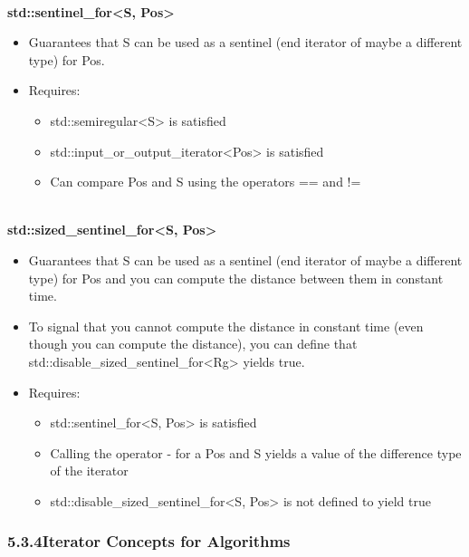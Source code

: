 \noindent
\hspace*{\fill} \\ %
\textbf{std::sentinel\_for<S, Pos>}

\begin{itemize}
\item
Guarantees that S can be used as a sentinel (end iterator of maybe a different type) for Pos.

\item
Requires:
\begin{itemize}
\item
std::semiregular<S> is satisfied

\item
std::input\_or\_output\_iterator<Pos> is satisfied

\item
Can compare Pos and S using the operators == and !=
\end{itemize}
\end{itemize}

\noindent
\hspace*{\fill} \\ %
\textbf{std::sized\_sentinel\_for<S, Pos>}

\begin{itemize}
\item
Guarantees that S can be used as a sentinel (end iterator of maybe a different type) for Pos and you can compute the distance between them in constant time.

\item
To signal that you cannot compute the distance in constant time (even though you can compute the distance), you can define that std::disable\_sized\_sentinel\_for<Rg> yields true.

\item
Requires:
\begin{itemize}
\item
std::sentinel\_for<S, Pos> is satisfied

\item
Calling the operator - for a Pos and S yields a value of the difference type of the iterator

\item
std::disable\_sized\_sentinel\_for<S, Pos> is not defined to yield true
\end{itemize}
\end{itemize}


\subsubsection*{ 5.3.4\hspace{0.2cm}Iterator Concepts for Algorithms}


